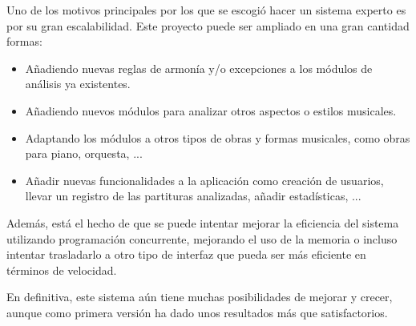 Uno de los motivos principales por los que se escogió hacer un sistema experto es por su gran escalabilidad. Este proyecto puede ser ampliado en una gran cantidad formas:

\begin{itemize}

	\item Añadiendo nuevas reglas de armonía y/o excepciones a los módulos de análisis ya existentes.
	\item Añadiendo nuevos módulos para analizar otros aspectos o estilos musicales.
	\item Adaptando los módulos a otros tipos de obras y formas musicales, como obras para piano, orquesta, ...
	\item Añadir nuevas funcionalidades a la aplicación como creación de usuarios, llevar un registro de las partituras analizadas, añadir estadísticas, ...
\end{itemize}

\bigskip

Además, está el hecho de que se puede intentar mejorar la eficiencia del sistema utilizando programación concurrente, mejorando el uso de la memoria o incluso intentar trasladarlo a otro tipo de interfaz que pueda ser más eficiente en términos de velocidad.

\bigskip
En definitiva, este sistema aún tiene muchas posibilidades de mejorar y crecer, aunque como primera versión ha dado unos resultados más que satisfactorios.